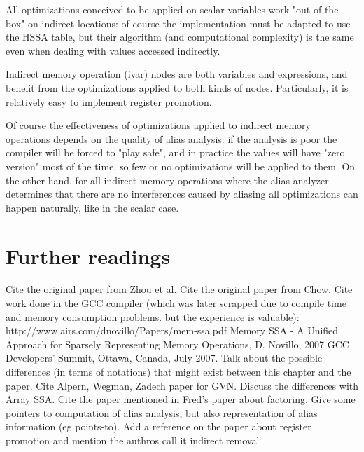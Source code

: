 All optimizations conceived to be applied on scalar variables work "out of the box" on indirect locations: of course the implementation must be adapted to use the HSSA table, but their algorithm (and computational complexity) is the same even when dealing with values accessed indirectly.

Indirect memory operation (ivar) nodes are both variables and expressions, and benefit from the optimizations applied to both kinds of nodes. Particularly, it is relatively easy to implement register promotion.

Of course the effectiveness of optimizations applied to indirect memory operations depends on the quality of alias analysis: if the analysis is poor the compiler will be forced to "play safe", and in practice the values will have "zero version" most of the time, so few or no optimizations will be applied to them.
On the other hand, for all indirect memory operations where the alias analyzer determines that there are no interferences caused by aliasing all optimizations can happen naturally, like in the scalar case.




\section{Further readings}
Cite the original paper from Zhou et al. \cite{ZhouCC11}
Cite the original paper from Chow.
Cite work done in the GCC compiler (which was later scrapped due to compile time and memory consumption problems. but the experience is valuable): http://www.airs.com/dnovillo/Papers/mem-ssa.pdf
Memory SSA - A Unified Approach for Sparsely Representing Memory Operations, D. Novillo, 2007 GCC Developers' Summit, Ottawa, Canada, July 2007.
Talk about the possible differences (in terms of notations) that might exist between this chapter and the paper.
Cite Alpern, Wegman, Zadech paper for GVN.
Discuss the differences with Array SSA.
Cite the paper mentioned in Fred's paper about factoring.
Give some pointers to computation of alias analysis, but also representation of alias information (eg points-to).
Add a reference on the paper about register promotion and mention the authros call it indirect removal 
